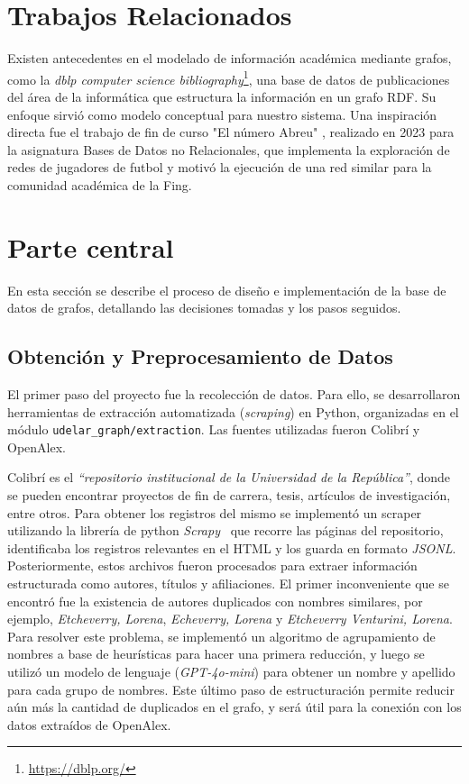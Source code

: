 \documentclass[journal]{IEEEtran}
\begin{document}
\section{Trabajos Relacionados}
\label{relacionados}
Existen antecedentes en el modelado de información académica mediante grafos, como la \textit{dblp computer science bibliography}\footnote{\url{https://dblp.org/}}, una base de datos de publicaciones del área de la informática que estructura la información en un grafo RDF. Su enfoque sirvió como modelo conceptual para nuestro sistema. Una inspiración directa fue el trabajo de fin de curso "El número Abreu" \cite{abreu2023}, realizado en 2023 para la asignatura Bases de Datos no Relacionales, que implementa la exploración de redes de jugadores de futbol y motivó la ejecución de una red similar para la comunidad académica de la Fing.

\section{Parte central}
\label{desarrollo}
En esta sección se describe el proceso de diseño e implementación de la base de datos de grafos, detallando las decisiones tomadas y los pasos seguidos.

\subsection{Obtención y Preprocesamiento de Datos}
El primer paso del proyecto fue la recolección de datos. Para ello, se desarrollaron herramientas de extracción automatizada (\textit{scraping}) en Python, organizadas en el módulo \texttt{udelar\_graph/extraction}. Las fuentes utilizadas fueron Colibrí y OpenAlex.

Colibrí es el \textit{``repositorio institucional de la Universidad de la República''}, donde se pueden encontrar proyectos de fin de carrera, tesis, artículos de investigación, entre otros. Para obtener los registros del mismo se implementó un scraper utilizando la librería de python \emph{Scrapy}~\cite{scrapy} que recorre las páginas del repositorio, identificaba los registros relevantes en el HTML y los guarda en formato \emph{JSONL}.
Posteriormente, estos archivos fueron procesados para extraer información estructurada como autores, títulos y afiliaciones. El primer inconveniente que se encontró fue la existencia de autores duplicados con nombres similares, por ejemplo, \textit{Etcheverry, Lorena}, \textit{Echeverry, Lorena} y \textit{Etcheverry Venturini, Lorena}. Para resolver este problema, se implementó un algoritmo de agrupamiento de nombres a base de heurísticas para hacer una primera reducción, y luego se utilizó un modelo de lenguaje (\emph{GPT-4o-mini}) para obtener un nombre y apellido para cada grupo de nombres. Este último paso de estructuración permite reducir aún más la cantidad de duplicados en el grafo, y será útil para la conexión con los datos extraídos de OpenAlex.
\end{document}
